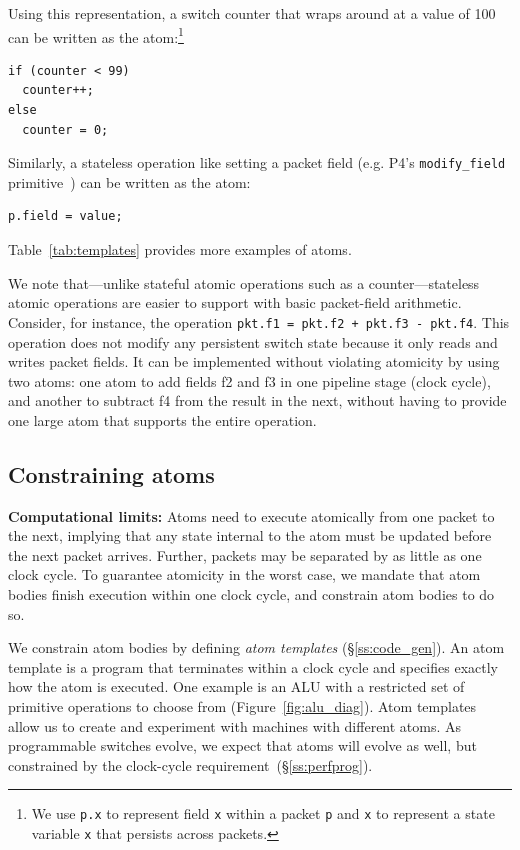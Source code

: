 Using this representation, a switch counter that wraps around at a
value of 100 can be written as the atom:\footnote{We use {\tt p.x} to
  represent field {\tt x} within a packet {\tt p} and {\tt x} to
  represent a state variable {\tt x} that persists across packets.}
\begin{lstlisting}[style=customc, numbers=none, frame=none]
if (counter < 99)
  counter++;
else
  counter = 0;
\end{lstlisting}
Similarly, a stateless operation like setting a packet field
(e.g. P4's {\tt modify\_field} primitive~\cite{p4spec}) can be written
as the atom:
\begin{lstlisting}[style=customc, numbers=none, frame=none]
  p.field = value;
\end{lstlisting}
Table~\ref{tab:templates} provides more examples of atoms.

We note that---unlike stateful atomic operations such as a counter---stateless
atomic operations are easier to support with basic packet-field arithmetic.
Consider, for instance, the operation {\tt pkt.f1 = pkt.f2 + pkt.f3 - pkt.f4}.
This operation does not modify any persistent switch state because it only
reads and writes packet fields. It can be implemented without violating
atomicity by using two atoms: one atom to add fields f2 and f3 in one pipeline
stage (clock cycle), and another to subtract f4 from the result in the next,
without having to provide one large atom that supports the entire operation.


\subsection{Constraining atoms}
\label{s:atomConstraints}

\textbf{Computational limits:} Atoms need to execute atomically from one packet
to the next, implying that any state internal to the atom must be updated
before the next packet arrives. Further, packets may be separated by as little
as one clock cycle. To guarantee atomicity in the worst case, we mandate that
atom bodies finish execution within one clock cycle, and constrain atom bodies
to do so.

We constrain atom bodies by defining {\it atom templates}
(\S\ref{ss:code_gen}).  An atom template is a program that terminates within a
clock cycle and specifies exactly how the atom is executed. One example is an
ALU with a restricted set of primitive operations to choose from
(Figure~\ref{fig:alu_diag}). Atom templates allow us to create and experiment
with \absmachine machines with different atoms. As programmable switches
evolve, we expect that atoms will evolve as well, but constrained by the
clock-cycle requirement~(\S\ref{ss:perfprog}).


